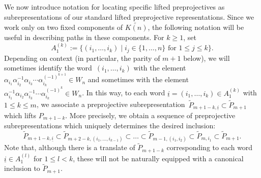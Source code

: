 \documentclass{amsart}
\numberwithin{equation}{section}
\newcommand{\ui}{{\underline i}}
\begin{document}
We now introduce notation for locating specific lifted preprojectives as subrepresentations of our standard lifted preprojective representations.
Since we work only on two fixed components of $\widetilde{K(n)}$, the following notation will be useful in describing paths in these components.
For $k\ge1$, set
\[A_1^{(k)}:=\{(i_1,\ldots,i_k)\mid i_j\in\{1,\ldots,n\}\text{ for $1\le j\le k$}\}.\]%
Depending on context (in particular, the parity of $m+1$ below), we will sometimes identify the word~$(i_1,\ldots,i_k)$ with the element $\alpha_{i_1}\alpha_{i_2}^{-1}\alpha_{i_3}\cdots\alpha_{i_k}^{(-1)^{k+1}}\in W_n$ and sometimes with the element $\alpha_{i_1}^{-1}\alpha_{i_2}\alpha_{i_3}^{-1}\cdots\alpha_{i_k}^{(-1)^k}\in W_n$.
In this way, to each word $\ui=(i_1,\ldots,i_k)\in A_1^{(k)}$ with $1\leq k\leq m$, we associate a preprojective subrepresentation~$\tilde P_{m+1-k,\ui}\subset\tilde P_{m+1}$ which lifts $P_{m+1-k}$.
More precisely, we obtain a sequence of preprojective subrepresentations which uniquely determines the desired inclusion:
\[\tilde P_{m+1-k,\ui}\subset\tilde P_{m+2-k,(i_1,\ldots,i_{k-1})}\subset\ldots\subset\tilde P_{m-1,(i_1,i_2)}\subset\tilde P_{m,i_1}\subset\tilde P_{m+1}.\]
Note that, although there is a translate of $\tilde P_{m+1-k}$ corresponding to each word $\ui\in A_1^{(l)}$ for $1\le l<k$, these will not be naturally equipped with a canonical inclusion to $\tilde P_{m+1}$.
\end{document}
